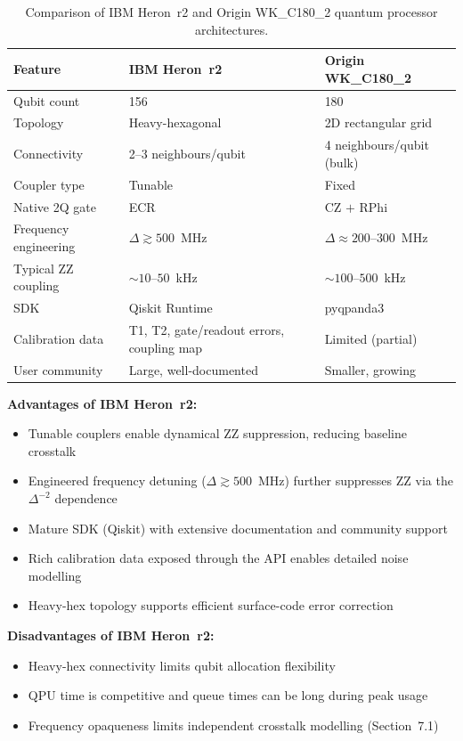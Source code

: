 \documentclass[11pt,a4paper]{article}
\begin{document}
\begin{table}[h]
\centering
\caption{Comparison of IBM Heron~r2 and Origin WK\_C180\_2 quantum processor architectures.}
\label{tab:platform}
\small
\begin{tabular}{p{3.2cm}p{2.5cm}p{2.5cm}}
\toprule
Feature & IBM Heron~r2 & Origin WK\_C180\_2 \\
\midrule
Qubit count & 156 & 180 \\
Topology & Heavy-hexagonal & 2D rectangular grid \\
Connectivity & 2--3 neighbours/qubit & 4 neighbours/qubit (bulk) \\
Coupler type & Tunable & Fixed \\
Native 2Q gate & ECR & CZ $+$ RPhi \\
Frequency engineering & $\Delta \gtrsim 500$~MHz & $\Delta \approx 200$--$300$~MHz \\
Typical ZZ coupling & $\sim 10$--$50$~kHz & $\sim 100$--$500$~kHz \\
SDK & Qiskit Runtime & pyqpanda3 \\
Calibration data & T1, T2, gate/readout errors, coupling map & Limited (partial) \\
User community & Large, well-documented & Smaller, growing \\
\bottomrule
\end{tabular}
\end{table}

\medskip\noindent\textbf{Advantages of IBM Heron~r2:}
\begin{itemize}[leftmargin=*]
    \item Tunable couplers enable dynamical ZZ suppression, reducing baseline crosstalk
    \item Engineered frequency detuning ($\Delta \gtrsim 500$~MHz) further suppresses ZZ
    via the $\Delta^{-2}$ dependence
    \item Mature SDK (Qiskit) with extensive documentation and community support
    \item Rich calibration data exposed through the API enables detailed noise modelling
    \item Heavy-hex topology supports efficient surface-code error correction
\end{itemize}

\noindent\textbf{Disadvantages of IBM Heron~r2:}
\begin{itemize}[leftmargin=*]
    \item Heavy-hex connectivity limits qubit allocation flexibility
    \item QPU time is competitive and queue times can be long during peak usage
    \item Frequency opaqueness limits independent crosstalk modelling (Section~7.1)
\end{itemize}
\end{document}
